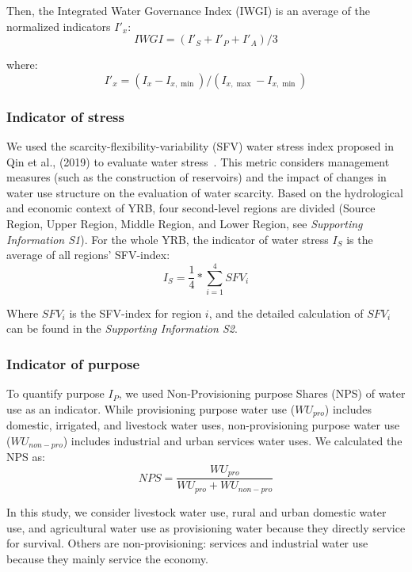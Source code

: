 \documentclass[draft]{../agujournal2019}
\begin{document}
	Then, the Integrated Water Governance Index (IWGI) is an average of the normalized indicators $I'_x$:
	\begin{equation}
		IWGI = (I'_S + I'_P + I'_A) / 3
	\end{equation}

	where:
	\begin{equation}
		I'_x = (I_x - I_{x, \min}) / (I_{x, \max} - I_{x, \min})
	\end{equation}

	\subsubsection*{Indicator of stress}
	We used the scarcity-flexibility-variability (SFV) water stress index proposed in Qin et al., (2019) to evaluate water stress~\cite{qin2019}. This metric considers management measures (such as the construction of reservoirs) and the impact of changes in water use structure on the evaluation of water scarcity. Based on the hydrological and economic context of YRB, four second-level regions are divided (Source Region, Upper Region, Middle Region, and Lower Region, see \textit{Supporting Information S1}). For the whole YRB, the indicator of water stress $I_S$ is the average of all regions' SFV-index:
	\begin{equation}
		I_S = \frac{1}{4} * \sum_{i=1}^4 SFV_{i}
	\end{equation}

	Where $SFV_i$ is the SFV-index for region $i$, and the detailed calculation of $SFV_i$ can be found in the \textit{Supporting Information S2}.

	\subsubsection*{Indicator of purpose}
	To quantify purpose $I_P$, we used Non-Provisioning purpose Shares (NPS) of water use as an indicator. While provisioning purpose water use ($WU_{pro}$) includes domestic, irrigated, and livestock water uses, non-provisioning purpose water use ($WU_{non-pro}$) includes industrial and urban services water uses. We calculated the NPS as:
	\begin{equation}
		NPS = \frac{WU_{pro}}{WU_{pro} + WU_{non-pro}}
	\end{equation}

	In this study, we consider livestock water use, rural and urban domestic water use, and agricultural water use as provisioning water because they directly service for survival. Others are non-provisioning: services and industrial water use because they mainly service the economy.
\end{document}
